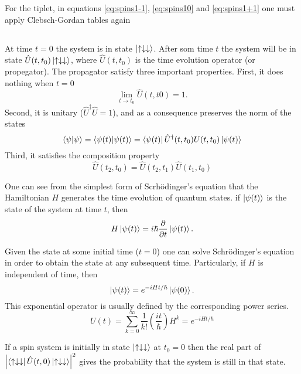 \documentclass{article}
\begin{document}
For the tiplet, in equations \ref{eq:spins1-1}, \ref{eq:spins10} and \ref{eq:spins1+1} one must apply Clebsch-Gordan tables again



\subsection{}
At time $t=0$ the system is in state $\ket{\uparrow\downarrow\downarrow}$. After som time $t$ the system will be in state $\hat{U}(t,t_0)\ket{\uparrow\downarrow\downarrow}$, where $\hat{U}(t,t_0)$ is the time evolution operator (or propegator). The propagator satisfy three important properties. First, it does nothing when $t=0$
\begin{equation}
\lim_{t\to t_0}\hat{U}(t,t0)=1.
\end{equation}
Second, it is unitary ($\hat{U}^{\dagger}\hat{U}=1$), and as a consequence preserves the norm of the states
\begin{equation}
\braket{\psi} = \braket{\psi(t)} = \bra{\psi(t)} \hat{U}^{\dagger}(t,t_0){U}(t,t_0) \ket{\psi(t)}
\end{equation}
Third, it satisfies the composition property
\begin{equation}
\hat{U}(t_2,t_0)=\hat{U}(t_2,t_1)\hat{U}(t_1,t_0)
\end{equation}

One can see from the simplest form of Scrhödinger's equation that the Hamiltonian $H$ generates the time evolution of quantum states. if $\ket{\psi(t)}$ is the state of the system at time $t$, then
\begin{equation}
H\ket{\psi(t)}=i\hbar\frac{\partial}{\partial t}\ket{\psi(t)}.
\end{equation}

Given the state at some initial time ($t=0$) one can solve Schrödinger's equation in order to obtain the state at any subsequent time. Particularly, if $H$ is independent of time, then
\begin{equation}
\ket{\psi(t)}=e^{-iHt/\hbar}\ket{\psi(0)}.
\end{equation}
This exponential operator is usually defined by the corresponding power series. 
\begin{equation}
U(t) = \sum_{k=0}^{\infty}\frac{1}{k!}\left(\frac{it}{\hbar} \right)H^k = e^{-iHt/\hbar}
\end{equation}

If a spin system is initially in state $\ket{\uparrow\downarrow\downarrow}$ at $t_0=0$ then the real part of $\abs{\bra{\uparrow\downarrow\downarrow}\hat{U}(t,0) \ket{\uparrow\downarrow\downarrow}}^2$ gives the probability that the system is still in that state.
\end{document}
